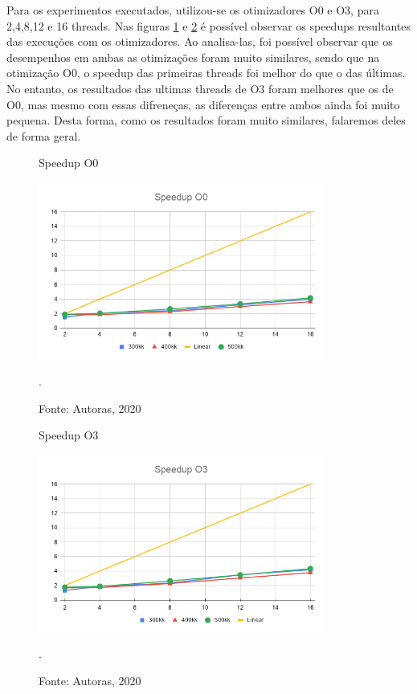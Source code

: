 \documentclass[journal]{IEEEtran}
\begin{document}
Para os experimentos executados, utilizou-se os otimizadores O0 e O3, para 2,4,8,12 e 16 threads. Nas figuras \ref{fig:speedupO0} e \ref{fig:speedupO3} é possível observar os speedups resultantes das execuções com os otimizadores. Ao analisa-las, foi possível observar que os desempenhos em ambas as otimizações foram muito similares, sendo que na otimização O0, o speedup das primeiras threads foi melhor do que o das últimas. No entanto, os resultados das ultimas threads de O3 foram melhores que os de O0, mas mesmo com essas difreneças, as diferenças entre ambos ainda foi muito pequena. Desta forma, como os resultados foram muito similares, falaremos deles de forma geral.

\begin{figure}[H]
    \centering
    \caption{Speedup O0}
    \centering
    \includegraphics[width=3.7in]{IEEEtran/imagens/SpeedupO0.png}
    \caption*{Fonte: Autoras, 2020}
    \DeclareGraphicsExtensions.
    \label{fig:speedupO0}
\end{figure}

\begin{figure}[H]
    \centering
    \caption{Speedup O3}
    \centering
    \includegraphics[width=3.7in]{IEEEtran/imagens/SpeedupO3.png}
    \caption*{Fonte: Autoras, 2020}
    \DeclareGraphicsExtensions.
    \label{fig:speedupO3}
\end{figure}
\end{document}
